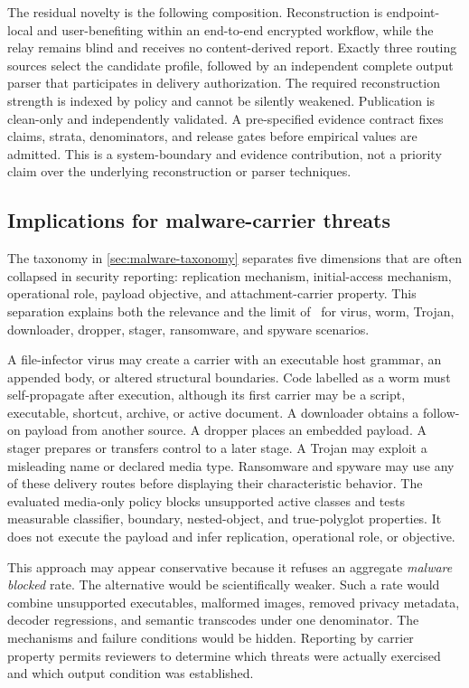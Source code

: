 The residual novelty is the following composition. Reconstruction is
endpoint-local and user-benefiting within an end-to-end encrypted workflow,
while the relay remains blind and receives no content-derived report. Exactly
three routing sources select the candidate profile, followed by an independent
complete output parser that participates in delivery authorization. The
required reconstruction strength is indexed by policy and cannot be silently
weakened. Publication is clean-only and independently validated. A
pre-specified evidence contract fixes claims, strata, denominators, and release
gates before empirical values are admitted. This is a system-boundary and
evidence contribution, not a priority claim over the underlying reconstruction
or parser techniques.

\subsection{Implications for malware-carrier threats}

The taxonomy in \cref{sec:malware-taxonomy} separates five dimensions that are
often collapsed in security reporting: replication mechanism, initial-access
mechanism, operational role, payload objective, and attachment-carrier
property. This separation explains both the relevance and the limit of \AFD\
for virus, worm, Trojan, downloader, dropper, stager, ransomware, and spyware
scenarios.

A file-infector virus may create a carrier with an executable host grammar, an
appended body, or altered structural boundaries. Code labelled as a worm must
self-propagate after execution, although its first carrier may be a script,
executable, shortcut, archive, or active document. A downloader obtains a
follow-on payload from another source. A dropper places an embedded payload. A
stager prepares or transfers control to a later stage. A Trojan may exploit a
misleading name or declared media type. Ransomware and spyware may use any of
these delivery routes before displaying their characteristic behavior. The
evaluated media-only policy blocks unsupported active classes and tests
measurable classifier, boundary, nested-object, and true-polyglot properties.
It does not execute the payload and infer replication, operational role, or
objective.

This approach may appear conservative because it refuses an aggregate
\emph{malware blocked} rate. The alternative would be scientifically weaker.
Such a rate would combine unsupported executables, malformed images, removed
privacy metadata, decoder regressions, and semantic transcodes under one
denominator.
The mechanisms and failure conditions would be hidden. Reporting by carrier
property permits reviewers to determine which threats were actually exercised
and which output condition was established.

